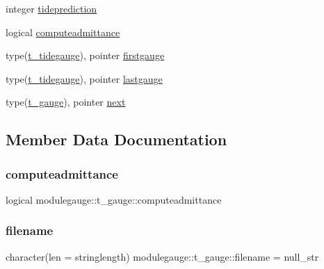 \begin{DoxyCompactItemize}
\item 
integer \mbox{\hyperlink{structmodulegauge_1_1t__gauge_a5bb8d533e82676556bbd21977c2eb4e1}{tideprediction}}
\item 
logical \mbox{\hyperlink{structmodulegauge_1_1t__gauge_a7845d5081c0719a128177270613eb950}{computeadmittance}}
\item 
type(\mbox{\hyperlink{structmodulegauge_1_1t__tidegauge}{t\+\_\+tidegauge}}), pointer \mbox{\hyperlink{structmodulegauge_1_1t__gauge_ac539f36ac4ee3b2581e11702ef378eb4}{firstgauge}}
\item 
type(\mbox{\hyperlink{structmodulegauge_1_1t__tidegauge}{t\+\_\+tidegauge}}), pointer \mbox{\hyperlink{structmodulegauge_1_1t__gauge_a944ee8b51bede06794d22a72e9bfe6e6}{lastgauge}}
\item 
type(\mbox{\hyperlink{structmodulegauge_1_1t__gauge}{t\+\_\+gauge}}), pointer \mbox{\hyperlink{structmodulegauge_1_1t__gauge_af38cd3b864adc6fc7c06185ad53bb851}{next}}
\end{DoxyCompactItemize}


\subsection{Member Data Documentation}
\mbox{\label{structmodulegauge_1_1t__gauge_a7845d5081c0719a128177270613eb950}} 
\subsubsection{\texorpdfstring{computeadmittance}{computeadmittance}}
{\footnotesize\ttfamily logical modulegauge\+::t\+\_\+gauge\+::computeadmittance\hspace{0.3cm}{\ttfamily [private]}}

\mbox{\label{structmodulegauge_1_1t__gauge_a5999698053496f6d17a3f9d2f7ffb4e7}} 
\subsubsection{\texorpdfstring{filename}{filename}}
{\footnotesize\ttfamily character(len = stringlength) modulegauge\+::t\+\_\+gauge\+::filename = null\+\_\+str\hspace{0.3cm}{\ttfamily [private]}}

